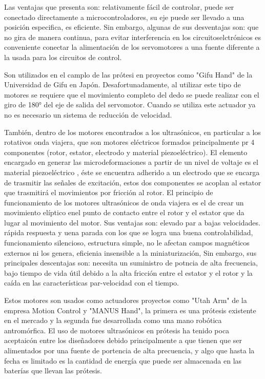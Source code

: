 \documentclass{article}
\begin{document}
Las ventajas que presenta son: relativamente fácil de controlar, puede ser conectado directamente a microcontroladores, su eje puede ser llevado a una posición especifica, es eficiente. Sin embargo, algunas de sus desventajas son: que no gira de manera continua, para evitar interferencia en los circuitoselctrónicos es conveniente conectar la alimentación de los servomotores a una fuente diferente a la usada para los circuitos de control\cite{ff2}. 

Son utilizados en el camplo de las prótesi en proyectos como "Gifu Hand" de la Universidad de Gifu en Japón. Desafortunadamente, al utilizar este tipo de motores se requiere que el movimiento completo del dedo se puede realizar con el giro de 180° del eje de salida del servomotor. Cuando se utiliza este actuador ya no es necesario un sistema de reducción de velocidad\cite{ff2}. 

También, dentro de los motores encontrados a los ultrasónicos, en particular a los rotativos onda viajera, que son motores eléctricos formados principalmente pr 4 componentes (rotor, estator, electrodo y material piezoeléctrico). El elemento encargado en generar las microdeformaciones a partir de un nivel de voltaje es el material piezoeléctrico , éste se encuentra adherido a un electrodo que se encarga de trasmitir las señales de excitación, estos dos componentes se acoplan al estator que trasmitirá el movimientos por fricción al rotor. El principio de funcionamiento de los motores ultrasónicos de onda viajera es el de crear un movimiento elíptico enel punto de contacto entre el rotor y el estator que da lugar al movimiento del motor. Sus ventajas son: elevado par a bajas velocidades. rápida respuesta y uena parada con los que se logra una buena controlabilidad, funcionamiento silencioso, estructura simple, no le afectan campos magnéticos externos ni los genera, eficienia insensible a la miniaturización, Sin embargo, sus principales descentajas son: necesita un suministro de potncia de alta frecuencia, bajo tiempo de vida útil debido a la alta fricción entre el estator y el rotor y la caída en las características par-velocidad con el tiempo\cite{ff2}. 

Estos motores son usados como actuadores  proyectos como "Utah Arm" de la empresa Motion Control y "MANUS Hand", la primera es una prótesis existente en el mercado y la segunda fue desarrollada como una mano robótica antromórfica. El uso de motores ultrasónicos en prótesis ha tenido poca aceptaicón entre los diseñadores debido principalmente a que tienen que ser alimentados por una fuente de portencia de alta precuencia, y algo que hasta la fecha es limitado es la cantidad de energía que puede ser almacenada en las baterías que llevan las prótesis\cite{ff2}. 
\end{document}
